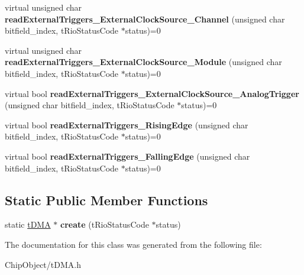 \begin{DoxyCompactItemize}
\item 
\hypertarget{classnFPGA_1_1nFRC__2012__1__6__4_1_1tDMA_a74ba424c8120e4e0396640c3be138996}{
virtual unsigned char {\bfseries readExternalTriggers\_\-ExternalClockSource\_\-Channel} (unsigned char bitfield\_\-index, tRioStatusCode $\ast$status)=0}
\label{classnFPGA_1_1nFRC__2012__1__6__4_1_1tDMA_a74ba424c8120e4e0396640c3be138996}

\item 
\hypertarget{classnFPGA_1_1nFRC__2012__1__6__4_1_1tDMA_ac9d6cf7795bac7eb0c6e76743895d81c}{
virtual unsigned char {\bfseries readExternalTriggers\_\-ExternalClockSource\_\-Module} (unsigned char bitfield\_\-index, tRioStatusCode $\ast$status)=0}
\label{classnFPGA_1_1nFRC__2012__1__6__4_1_1tDMA_ac9d6cf7795bac7eb0c6e76743895d81c}

\item 
\hypertarget{classnFPGA_1_1nFRC__2012__1__6__4_1_1tDMA_a7ef28cf4da51f15777b9df0afc2d5b06}{
virtual bool {\bfseries readExternalTriggers\_\-ExternalClockSource\_\-AnalogTrigger} (unsigned char bitfield\_\-index, tRioStatusCode $\ast$status)=0}
\label{classnFPGA_1_1nFRC__2012__1__6__4_1_1tDMA_a7ef28cf4da51f15777b9df0afc2d5b06}

\item 
\hypertarget{classnFPGA_1_1nFRC__2012__1__6__4_1_1tDMA_a4d8d9ec6e4de3f40ccbb2c9095612de5}{
virtual bool {\bfseries readExternalTriggers\_\-RisingEdge} (unsigned char bitfield\_\-index, tRioStatusCode $\ast$status)=0}
\label{classnFPGA_1_1nFRC__2012__1__6__4_1_1tDMA_a4d8d9ec6e4de3f40ccbb2c9095612de5}

\item 
\hypertarget{classnFPGA_1_1nFRC__2012__1__6__4_1_1tDMA_a3812bfb112d7f5044df718d74e8a6086}{
virtual bool {\bfseries readExternalTriggers\_\-FallingEdge} (unsigned char bitfield\_\-index, tRioStatusCode $\ast$status)=0}
\label{classnFPGA_1_1nFRC__2012__1__6__4_1_1tDMA_a3812bfb112d7f5044df718d74e8a6086}

\end{DoxyCompactItemize}
\subsection*{Static Public Member Functions}
\begin{DoxyCompactItemize}
\item 
\hypertarget{classnFPGA_1_1nFRC__2012__1__6__4_1_1tDMA_afeb7f800be1df959bbe410d298a4ab54}{
static \hyperlink{classnFPGA_1_1nFRC__2012__1__6__4_1_1tDMA}{tDMA} $\ast$ {\bfseries create} (tRioStatusCode $\ast$status)}
\label{classnFPGA_1_1nFRC__2012__1__6__4_1_1tDMA_afeb7f800be1df959bbe410d298a4ab54}

\end{DoxyCompactItemize}


The documentation for this class was generated from the following file:\begin{DoxyCompactItemize}
\item 
ChipObject/tDMA.h\end{DoxyCompactItemize}
